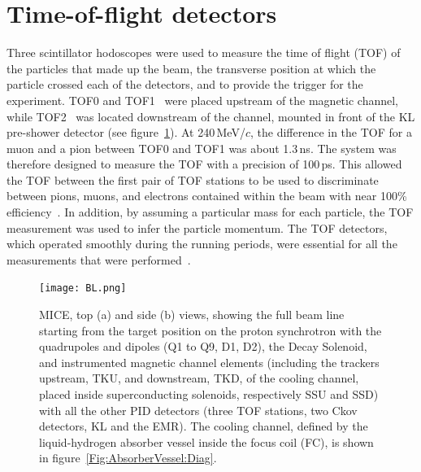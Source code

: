 \graphicspath{{02-TOF/Figures/}}

\newcommand{\Tzero}{\ensuremath{T0}}
\newcommand{\Gauss}{\ensuremath{\text{G}}}
\newcommand{\DT}{\ensuremath{\Delta T}}
\newcommand{\us}{\ensuremath{\mu\text{s}}}

\section{Time-of-flight detectors}
\label{Sect:TOF}

Three scintillator hodoscopes were used to measure the time of flight
(TOF) of the particles that made up the beam, the transverse position
at which the particle crossed each of the detectors, and to provide
the trigger for the experiment. 
TOF0 and TOF1~\cite{NOTE145,NOTE241,2010NIMPA.615...14B} were
placed upstream of the magnetic channel, while TOF2~\cite{NOTE286}
was located downstream of the channel, mounted in front of the KL
pre-shower detector (see figure~\ref{fig:BL}).
At 240\,MeV/$c$, the difference in the TOF for a muon and a
pion between TOF0 and TOF1 was about 1.3\,ns.
The system was therefore designed to measure the TOF with a
precision of 100\,ps. 
This allowed the TOF between the first pair of TOF stations 
to be used to discriminate between pions, muons, and electrons
contained within the beam with near 100\% efficiency~\cite{2016JInst..11P3001A}.
In addition, by assuming a particular mass for each particle, the
TOF measurement was used to infer the particle
momentum.
The TOF detectors, which operated smoothly during the running periods,
were essential for all the measurements that were
performed~\cite{Bogomilov:2012sr,Adams:2013lba,2015JInst..10P2012A,2016JInst..11P3001A,Adams:2018qhj,Bogomilov:2019kfj}.
\begin{figure}
  \begin{center}
    \texttt{[image: BL.png]}
    \caption{
      MICE, top (a) and side (b) views, showing the full beam line
      starting from the target position on the proton synchrotron with the quadrupoles and dipoles (Q1 to Q9, D1, D2), the
      Decay Solenoid, and instrumented magnetic channel elements
      (including the trackers upstream, TKU, and downstream, TKD, of the cooling
      channel, placed inside superconducting solenoids, respectively SSU and SSD) with all the
      other PID detectors (three TOF stations, two Ckov detectors, KL and
      the EMR).
      The cooling channel, defined by the liquid-hydrogen absorber
      vessel inside the focus coil (FC), is shown in figure~\ref{Fig:AbsorberVessel:Diag}.
    }
    \label{fig:BL}
  \end{center}
\end{figure}

